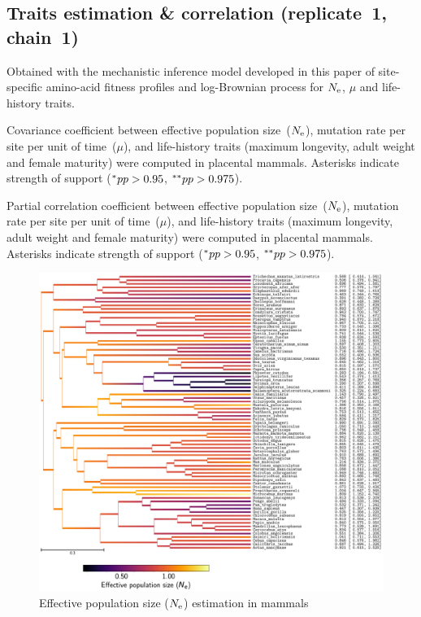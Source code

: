 \documentclass{article}
\begin{document}
	\subsection{Traits estimation \& correlation (replicate~1, chain~1)}
	Obtained with the mechanistic inference model developed in this paper of site-specific amino-acid fitness profiles and log-Brownian process for $\Ne$, $\mu$ and life-history traits.

	\begin{table}[H]
		
		\caption[Covariance matrix in mammals]{
		Covariance coefficient between effective population size~($\Ne$), mutation rate per site per unit of time~($\mu$), and life-history traits (maximum longevity, adult weight and female maturity) were computed in placental mammals.
		Asterisks indicate strength of support ($\smash{^{*}} pp > 0.95$, $\smash{^{**}} pp > 0.975$).}
	\end{table}

	\begin{table}[H]
		
		\caption[Partial correlation coefficient matrix in mammals]{
		Partial correlation coefficient between effective population size~($\Ne$), mutation rate per site per unit of time~($\mu$), and life-history traits (maximum longevity, adult weight and female maturity) were computed in placental mammals.
		Asterisks indicate strength of support ($\smash{^{*}} pp > 0.95$, $\smash{^{**}} pp > 0.975$).}
		\label{tab:table-partcor-mammals}
	\end{table}

	\begin{figure}[H]
		\centering
		\includegraphics[width=\linewidth, page=1]{mammals/18CDS_SiteMutSelBranchNe_R1_LogPopulationSize}
		\caption[$\Ne$ estimation in mammals]{Effective population size ($\Ne$) estimation in mammals}
	\end{figure}
\end{document}
